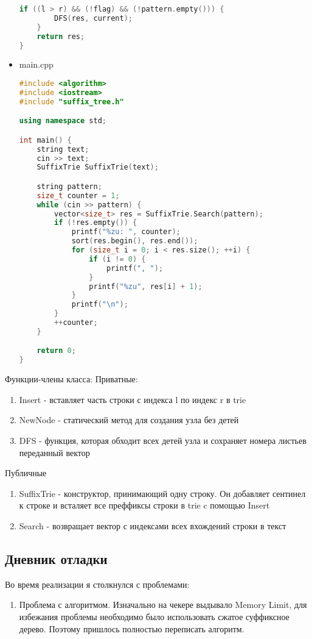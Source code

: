\documentclass[12pt]{article}
\begin{document}
\begin{itemize}
\begin{lstlisting}[language=C++]
    if ((l > r) && (!flag) && (!pattern.empty())) {
        DFS(res, current);
    }
    return res;
}
        \end{lstlisting}
        \item
        main.cpp
        \begin{lstlisting}[language=C++]
#include <algorithm>
#include <iostream>
#include "suffix_tree.h"

using namespace std;

int main() {
    string text;
    cin >> text;
    SuffixTrie SuffixTrie(text);

    string pattern;
    size_t counter = 1;
    while (cin >> pattern) {
        vector<size_t> res = SuffixTrie.Search(pattern);
        if (!res.empty()) {
            printf("%zu: ", counter);
            sort(res.begin(), res.end());
            for (size_t i = 0; i < res.size(); ++i) {
                if (i != 0) {
                    printf(", ");
                }
                printf("%zu", res[i] + 1);
            }
            printf("\n");
        }
        ++counter;
    }

    return 0;
}
        \end{lstlisting}
\end{itemize}

Функции-члены класса:
Приватные:
\begin{enumerate}
    \item Insert - вставляет часть строки с индекса l по индекс r в trie
    \item NewNode - статический метод для создания узла без детей
    \item DFS - функция, которая обходит всех детей узла и сохраняет номера листьев переданный вектор
\end{enumerate}
Публичные
\begin{enumerate}
    \item SuffixTrie - конструктор, принимающий одну строку. Он добавляет сентинел к строке и всталяет все преффиксы строки в trie c помощью Insert
    \item Search - возвращает вектор с индексами всех вхождений строки в текст
\end{enumerate}

\subsection*{Дневник отладки}

Во время реализации я столкнулся с проблемами:
\begin{enumerate}
    \item Проблема с алгоритмом. Изначально на чекере выдывало Memory Limit, для избежания проблемы необходимо было использовать сжатое суффиксное дерево. Поэтому пришлось полностью переписать алгоритм.
\end{enumerate}
\end{document}
